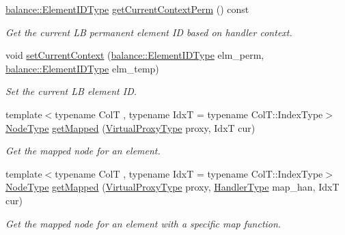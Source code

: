 \begin{DoxyCompactItemize}
\hyperlink{namespacevt_1_1vrt_1_1collection_1_1balance_a14c8d2c972f2913aa3f1636e5be0a120}{balance\+::\+Element\+I\+D\+Type} \hyperlink{structvt_1_1vrt_1_1collection_1_1_collection_manager_a9dc40e7ddd4cd8d4fa0fb5e10381f73f}{get\+Current\+Context\+Perm} () const
\begin{DoxyCompactList}\small\item\em Get the current LB permanent element ID based on handler context. \end{DoxyCompactList}\item 
void \hyperlink{structvt_1_1vrt_1_1collection_1_1_collection_manager_a4f278f2bc3e5304307098f6f7420b964}{set\+Current\+Context} (\hyperlink{namespacevt_1_1vrt_1_1collection_1_1balance_a14c8d2c972f2913aa3f1636e5be0a120}{balance\+::\+Element\+I\+D\+Type} elm\+\_\+perm, \hyperlink{namespacevt_1_1vrt_1_1collection_1_1balance_a14c8d2c972f2913aa3f1636e5be0a120}{balance\+::\+Element\+I\+D\+Type} elm\+\_\+temp)
\begin{DoxyCompactList}\small\item\em Set the current LB element ID. \end{DoxyCompactList}\item 
{\footnotesize template$<$typename ColT , typename IdxT  = typename Col\+T\+::\+Index\+Type$>$ }\\\hyperlink{namespacevt_a866da9d0efc19c0a1ce79e9e492f47e2}{Node\+Type} \hyperlink{structvt_1_1vrt_1_1collection_1_1_collection_manager_a7db90d5e08077593edbff643b579c2cb}{get\+Mapped} (\hyperlink{namespacevt_a1b417dd5d684f045bb58a0ede70045ac}{Virtual\+Proxy\+Type} proxy, IdxT cur)
\begin{DoxyCompactList}\small\item\em Get the mapped node for an element. \end{DoxyCompactList}\item 
{\footnotesize template$<$typename ColT , typename IdxT  = typename Col\+T\+::\+Index\+Type$>$ }\\\hyperlink{namespacevt_a866da9d0efc19c0a1ce79e9e492f47e2}{Node\+Type} \hyperlink{structvt_1_1vrt_1_1collection_1_1_collection_manager_a9085fd0dc95af7d4a887e250e7623fd6}{get\+Mapped} (\hyperlink{namespacevt_a1b417dd5d684f045bb58a0ede70045ac}{Virtual\+Proxy\+Type} proxy, \hyperlink{namespacevt_af64846b57dfcaf104da3ef6967917573}{Handler\+Type} map\+\_\+han, IdxT cur)
\begin{DoxyCompactList}\small\item\em Get the mapped node for an element with a specific map function. \end{DoxyCompactList}\item 

\end{DoxyCompactItemize}
